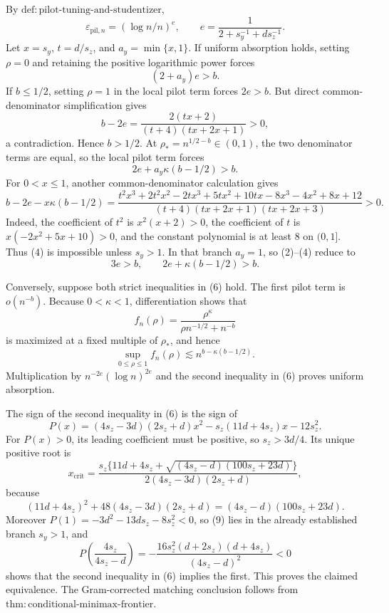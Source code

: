 By \(\mathrm{def{:}pilot\text{-}tuning\text{-}and\text{-}studentizer}\),
\[
\varepsilon_{\mathrm{pil},n}=(\log n/n)^e,
\qquad
e=\frac1{2+s_y^{-1}+ds_z^{-1}}.                                   \tag{1}
\]
Let \(x=s_y\), \(t=d/s_z\), and \(a_y=\min\{x,1\}\). If uniform absorption holds, setting \(\rho=0\) and retaining the positive logarithmic power forces
\[
(2+a_y)e>b.                                                         \tag{2}
\]
If \(b\le1/2\), setting \(\rho=1\) in the local pilot term forces \(2e>b\). But direct common-denominator simplification gives
\[
b-2e=\frac{2(tx+2)}{(t+4)(tx+2x+1)}>0,                              \tag{3}
\]
a contradiction. Hence \(b>1/2\). At \(\rho_*=n^{1/2-b}\in(0,1)\), the two denominator terms are equal, so the local pilot term forces
\[
2e+a_y\kappa(b-1/2)>b.                                             \tag{4}
\]
For \(0<x\le1\), another common-denominator calculation gives
\[
b-2e-x\kappa(b-1/2)
=\frac{t^2x^3+2t^2x^2-2tx^3+5tx^2+10tx-8x^3-4x^2+8x+12}
{(t+4)(tx+2x+1)(tx+2x+3)}>0.                                      \tag{5}
\]
Indeed, the coefficient of \(t^2\) is \(x^2(x+2)>0\), the coefficient of \(t\) is \(x(-2x^2+5x+10)>0\), and the constant polynomial is at least \(8\) on \((0,1]\). Thus (4) is impossible unless \(s_y>1\). In that branch \(a_y=1\), so (2)--(4) reduce to
\[
3e>b,
\qquad
2e+\kappa(b-1/2)>b.                                                \tag{6}
\]

Conversely, suppose both strict inequalities in (6) hold. The first pilot term is \(o(n^{-b})\). Because \(0<\kappa<1\), differentiation shows that
\[
f_n(\rho)=\frac{\rho^\kappa}{\rho n^{-1/2}+n^{-b}}
\]
is maximized at a fixed multiple of \(\rho_*\), and hence
\[
\sup_{0\le\rho\le1}f_n(\rho)\lesssim n^{b-\kappa(b-1/2)}.         \tag{7}
\]
Multiplication by \(n^{-2e}(\log n)^{2e}\) and the second inequality in (6) proves uniform absorption.

The sign of the second inequality in (6) is the sign of
\[
P(x)=(4s_z-3d)(2s_z+d)x^2-s_z(11d+4s_z)x-12s_z^2.                  \tag{8}
\]
For \(P(x)>0\), its leading coefficient must be positive, so \(s_z>3d/4\). Its unique positive root is
\[
x_{\mathrm{crit}}=
\frac{s_z\{11d+4s_z+\sqrt{(4s_z-d)(100s_z+23d)}\}}
{2(4s_z-3d)(2s_z+d)},                                               \tag{9}
\]
because
\[
(11d+4s_z)^2+48(4s_z-3d)(2s_z+d)=(4s_z-d)(100s_z+23d).
\]
Moreover \(P(1)=-3d^2-13ds_z-8s_z^2<0\), so (9) lies in the already established branch \(s_y>1\), and
\[
P\!\left(\frac{4s_z}{4s_z-d}\right)
=-\frac{16s_z^2(d+2s_z)(d+4s_z)}{(4s_z-d)^2}<0                    \tag{10}
\]
shows that the second inequality in (6) implies the first. This proves the claimed equivalence. The Gram-corrected matching conclusion follows from \(\mathrm{thm{:}conditional\text{-}minimax\text{-}frontier}\).

